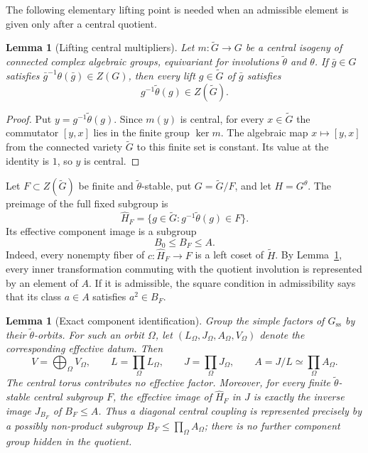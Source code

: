 \documentclass[11pt,reqno]{amsart}
\numberwithin{equation}{section}
\newtheorem{lemma}[theorem]{Lemma}
\theoremstyle{definition}
\theoremstyle{remark}
\begin{document}
The following elementary lifting point is needed when an admissible element is
given only after a central quotient.

\begin{lemma}[Lifting central multipliers]\label{lem:lifting-multiplier}
Let $m:\widetilde G\to G$ be a central isogeny of connected complex algebraic
groups, equivariant for involutions $\widetilde\theta$ and $\theta$.  If
$\bar g\in G$ satisfies
$\bar g^{-1}\theta(\bar g)\in Z(G)$, then every lift $g\in\widetilde G$ of
$\bar g$ satisfies
\[
 g^{-1}\widetilde\theta(g)\in Z(\widetilde G).
\]
\end{lemma}

\begin{proof}
Put $y=g^{-1}\widetilde\theta(g)$.  Since $m(y)$ is central, for every
$x\in\widetilde G$ the commutator $[y,x]$ lies in the finite group $\ker m$.
The algebraic map $x\mapsto[y,x]$ from the connected variety
$\widetilde G$ to this finite set is constant.  Its value at the identity is
$1$, so $y$ is central.
\end{proof}

Let $F\subset Z(\widetilde G)$ be finite and $\widetilde\theta$-stable, put
$G=\widetilde G/F$, and let $H=G^\theta$.  The preimage of the full fixed
subgroup is
\begin{equation}\label{eq:preimage-fixed}
 \widehat H_F
 =\{g\in\widetilde G:g^{-1}\widetilde\theta(g)\in F\}.
\end{equation}
Its effective component image is a subgroup
\[
 B_0\leq B_F\leq A.
\]
Indeed, every nonempty fiber of $c:\widehat H_F\to F$ is a left coset of
$\widetilde H$.  By Lemma~\ref{lem:lifting-multiplier}, every inner
transformation commuting with the quotient involution is represented by an
element of $A$.  If it is admissible, the square condition in admissibility
says that its class $a\in A$ satisfies $a^2\in B_F$.

\begin{lemma}[Exact component identification]
\label{lem:exact-component-identification}
Group the simple factors of $G_{\mathrm{ss}}$ by their
$\widetilde\theta$-orbits.  For such an orbit $\Omega$, let
$(L_\Omega,J_\Omega,A_\Omega,V_\Omega)$ denote the corresponding effective
datum.  Then
\[
 V=\bigoplus_\Omega V_\Omega,\qquad
 L=\prod_\Omega L_\Omega,\qquad
 J=\prod_\Omega J_\Omega,\qquad
 A=J/L\simeq\prod_\Omega A_\Omega.
\]
The central torus contributes no effective factor.  Moreover, for every
finite $\widetilde\theta$-stable central subgroup $F$, the effective image of
$\widehat H_F$ in $J$ is exactly the inverse image $J_{B_F}$ of $B_F\leq A$.
Thus a diagonal central coupling is represented precisely by a possibly
non-product subgroup $B_F\leq\prod_\Omega A_\Omega$; there is no further
component group hidden in the quotient.
\end{lemma}
\end{document}
